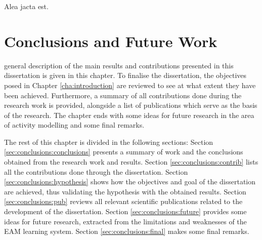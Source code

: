 

\begin{savequote}[50mm]
Alea jacta est.
\end{savequote}


\chapter{Conclusions and Future Work}
\label{cha:conclusions}

\ifpdf
    \graphicspath{{7_conclusions/figures/PDF/}{7_conclusions/figures/PNG/}{7_conclusions/figures/}}
\else
    \graphicspath{{7_conclusions/figures/EPS/}{7_conclusions/figures/}}
\fi

 general description of the main results and contributions presented in this dissertation is given in this chapter. To finalise the dissertation, the objectives posed in Chapter \ref{cha:introduction} are reviewed to see at what extent they have been achieved. Furthermore, a summary of all contributions done during the research work is provided, alongside a list of publications which serve as the basis of the research. The chapter ends with some ideas for future research in the area of activity modelling and some final remarks.

The rest of this chapter is divided in the following sections: Section \ref{sec:conclusions:conclusions} presents a summary of work and the conclusions obtained from the research work and results. Section \ref{sec:conclusions:contrib} lists all the contributions done through the dissertation. Section \ref{sec:conclusions:hypothesis} shows how the objectives and goal of the dissertation are achieved, thus validating the hypothesis with the obtained results. Section \ref{sec:conclusions:pub} reviews all relevant scientific publications related to the development of the dissertation. Section \ref{sec:conclusions:future} provides some ideas for future research, extracted from the limitations and weaknesses of the EAM learning system. Section \ref{sec:conclusions:final} makes some final remarks.